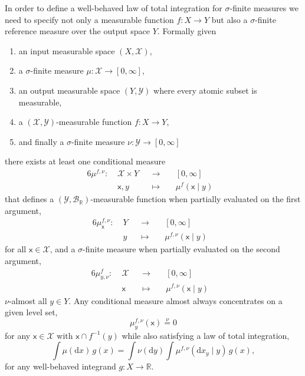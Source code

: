 \documentclass[11pt, oneside]{article}
\begin{document}
In order to define a well-behaved law of total integration for $\sigma$-finite measures 
we need to specify not only a measurable function $f: X \rightarrow Y$ but also a 
$\sigma$-finite reference measure over the output space $Y$.  Formally given 
%
\begin{enumerate}
  \item an input measurable space $(X, \mathcal{X})$,
  \item a $\sigma$-finite measure $\mu : \mathcal{X} \rightarrow [0, \infty]$, 
  \item an output measurable space $(Y, \mathcal{Y})$ where every atomic subset is measurable, 
  \item a $(\mathcal{X}, \mathcal{Y})$-measurable function $f: X \rightarrow Y$, 
  \item and finally a $\sigma$-finite measure $\nu : \mathcal{Y} \rightarrow [0, \infty]$ 
\end{enumerate}
there exists at least one conditional measure
%
\begin{alignat*}{6}
\mu^{f, \nu} :\; &\mathcal{X} \times Y& &\rightarrow& \; &[0, \infty]&
\\
&\mathsf{x}, y& &\mapsto& &\mu^{f}( \mathsf{x} \mid y )&
\end{alignat*}
%
that defines a $(\mathcal{Y}, \mathcal{B}_{\mathbb{R}})$-measurable function when 
partially evaluated on the first argument,
%
\begin{alignat*}{6}
\mu^{f, \nu}_{\mathsf{x}} :\; &Y& &\rightarrow& \; &[0, \infty]&
\\
&y& &\mapsto& &\mu^{f, \nu}( \mathsf{x} \mid y )&
\end{alignat*}
%
for all $\mathsf{x} \in \mathcal{X}$, and a $\sigma$-finite measure when partially 
evaluated on the second argument,
%
\begin{alignat*}{6}
\mu^{f}_{y, \nu} :\; &\mathcal{X}& &\rightarrow& \; &[0, \infty]&
\\
&\mathsf{x}& &\mapsto& &\mu^{f, \nu}( \mathsf{x} \mid y )&
\end{alignat*}
%
$\nu$-almost all $y \in Y$.
%
Any conditional measure almost always concentrates on a given level set,
%
\begin{equation*}
\mu^{f, \nu}_{y}( \mathsf{x} ) \overset{\nu}{=} 0
\end{equation*}
%
for any $\mathsf{x} \in \mathcal{X}$ with $\mathsf{x} \cap f^{-1}(y)$
while also satisfying a law of total integration,
%
\begin{equation*}
\int \mu( \mathrm{d} x ) \, g(x)
=
\int \nu (\mathrm{d} y) \int \mu^{f, \nu}( \mathrm{d}x_{y} \mid y ) \, g(x),
\end{equation*}
%
for any well-behaved integrand $g : X \rightarrow \mathbb{R}$.
\end{document}
